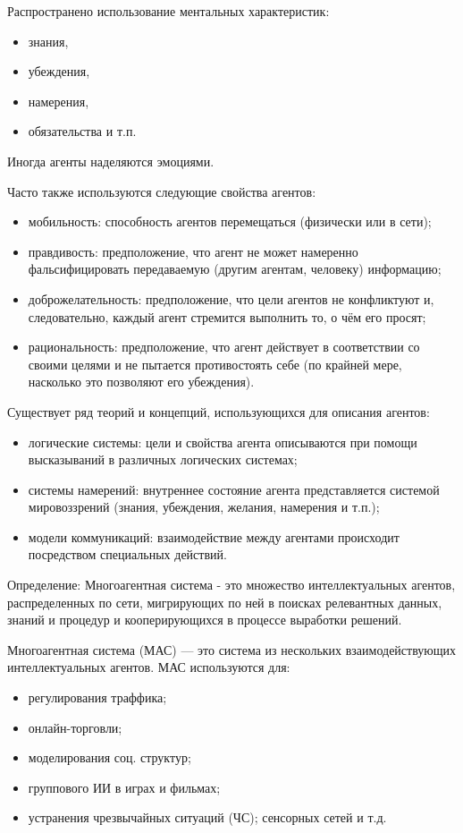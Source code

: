 Распространено использование ментальных характеристик:
\begin{itemize}
  \item знания,
  \item убеждения,
  \item намерения,
  \item обязательства и т.п.
\end{itemize}

Иногда агенты наделяются эмоциями.

Часто также используются следующие свойства агентов:
\begin{itemize}
  \item мобильность: способность агентов перемещаться
(физически или в сети);
  \item правдивость: предположение, что агент не может намеренно
фальсифицировать передаваемую (другим агентам, человеку)
информацию;
  \item доброжелательность: предположение, что цели агентов не
конфликтуют и, следовательно, каждый агент стремится
выполнить то, о чём его просят;
  \item рациональность: предположение, что агент действует в
соответствии со своими целями и не пытается противостоять себе
(по крайней мере, насколько это позволяют его убеждения).
\end{itemize}

Существует ряд теорий и концепций, использующихся для описания
агентов:
\begin{itemize}
  \item логические системы: цели и свойства агента описываются при
помощи высказываний в различных логических системах;
  \item системы намерений: внутреннее состояние агента представляется
системой мировоззрений (знания, убеждения, желания,
намерения и т.п.);
  \item модели коммуникаций: взаимодействие между агентами
происходит посредством специальных действий.
\end{itemize}

Определение: Многоагентная система - это множество интеллектуальных агентов, распределенных по сети, мигрирующих по ней в поисках релевантных данных, знаний и процедур и кооперирующихся в процессе выработки решений. 

Многоагентная система (МАС) — это система из нескольких
взаимодействующих интеллектуальных агентов.
МАС используются для:
\begin{itemize}
  \item регулирования траффика;
  \item онлайн-торговли;
  \item моделирования соц. структур;
  \item группового ИИ в играх и фильмах;
  \item устранения чрезвычайных ситуаций (ЧС);
сенсорных сетей и т.д.
\end{itemize}

